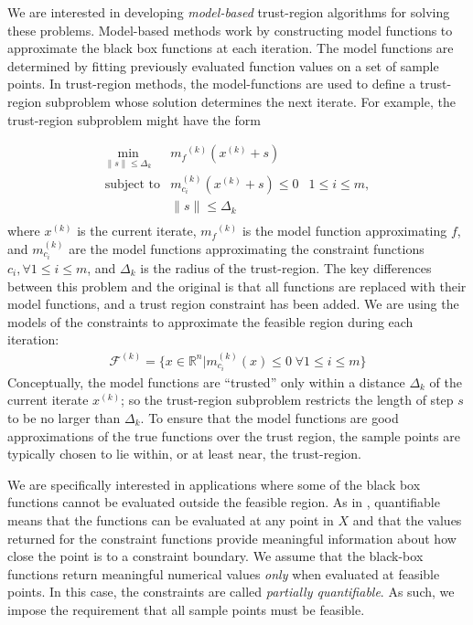 \documentclass{article}
\theoremstyle{case}
\numberwithin{theorem}{subsection}
\newcommand{\dk}{\Delta_k}
\newcommand{\feasiblek}{{\mathcal F^{(k)}}}
\newcommand{\mcik}{{{m}^{(k)}_{c_i}}}
\newcommand{\mfk}{{{m}_f}^{(k)}}
\newcommand{\Rn}{\mathbb R^n}
\newcommand{\xk}{{x^{(k)}}}
\begin{document}
We are interested in developing {\em model-based} trust-region algorithms for solving these problems.
Model-based methods work by constructing model functions to approximate the black box functions at each iteration.
The model functions are determined by fitting previously evaluated function values on a set of sample points.
In trust-region methods, the model-functions are used to define a trust-region subproblem whose solution determines the next iterate.
For example, the trust-region subproblem might have the form

\[ \begin{array}{ccl} \min_{\|s\| \le \dk}
 & \mfk (\xk+s) \\
\mbox{subject to} & \mcik(\xk + s) \le 0 & 1 \le i \le m, \\
& \|s\| \le \dk \\
\end{array}
\]
where $\xk$ is the current iterate, $\mfk$ is the model function approximating $f$, 
and $\mcik$ are the model functions approximating the constraint functions $c_i, \forall 1 \le i \le m$, and $\dk$ is the radius of the trust-region.
The key differences between this problem and the original is that all functions are replaced with their model functions, and a trust region constraint has been added.
We are using the models of the constraints to approximate the feasible region during each iteration:
\begin{align}
\feasiblek = \{x \in \Rn | \mcik(x) \le 0 \; \forall 1 \le i \le m \} \label{define_feasiblek}
\end{align}
Conceptually, the model functions are ``trusted'' only within a distance $ \dk $ of the current iterate $\xk$; so the trust-region subproblem restricts the length of step $s$ to be no larger than $\dk$.
To ensure that the model functions are good approximations of the true functions over the trust region, the sample points are typically chosen to lie within, or at least near, the trust-region.


We are specifically interested in applications where some of the black box functions cannot be evaluated outside the feasible region.
As in \cite{DUMMY:typesofconstraints}, quantifiable means that the functions can be evaluated at any point in $X$ and that the values returned for the constraint functions provide meaningful information about how close the point is to a constraint boundary.
We assume that the black-box functions return meaningful numerical values \emph{only} when evaluated at feasible points.
In this case, the constraints are called {\em partially quantifiable}.   
As such, we impose the requirement that all sample points must be feasible.
\end{document}
